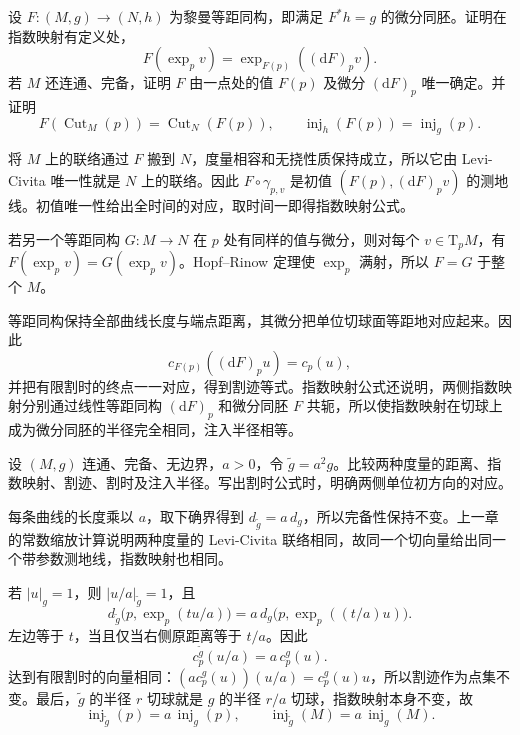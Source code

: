 \begin{exercise}\label{g3:ex:isometry-first-jet}
	设 \(F:(M,g)\to(N,h)\) 为黎曼等距同构，即满足 \(F^*h=g\) 的微分同胚。证明在指数映射有定义处，
	\[
		F(\exp_pv)=\exp_{F(p)}((\mathrm dF)_pv).
	\]
	若 \(M\) 还连通、完备，证明 \(F\) 由一点处的值 \(F(p)\) 及微分 \((\mathrm dF)_p\) 唯一确定。并证明
	\[
		F(\operatorname{Cut}_M(p))=\operatorname{Cut}_N(F(p)),\qquad
		\operatorname{inj}_h(F(p))=\operatorname{inj}_g(p).
	\]
\end{exercise}
\begin{solution}
	将 \(M\) 上的联络通过 \(F\) 搬到 \(N\)，度量相容和无挠性质保持成立，所以它由 Levi-Civita 唯一性就是 \(N\) 上的联络。因此 \(F\circ\gamma_{p,v}\) 是初值 \((F(p),(\mathrm dF)_pv)\) 的测地线。初值唯一性给出全时间的对应，取时间一即得指数映射公式。

	若另一个等距同构 \(G:M\to N\) 在 \(p\) 处有同样的值与微分，则对每个 \(v\in\mathrm T_pM\)，有 \(F(\exp_pv)=G(\exp_pv)\)。Hopf--Rinow 定理使 \(\exp_p\) 满射，所以 \(F=G\) 于整个 \(M\)。

	等距同构保持全部曲线长度与端点距离，其微分把单位切球面等距地对应起来。因此
	\[
		c_{F(p)}((\mathrm dF)_pu)=c_p(u),
	\]
	并把有限割时的终点一一对应，得到割迹等式。指数映射公式还说明，两侧指数映射分别通过线性等距同构 \((\mathrm dF)_p\) 和微分同胚 \(F\) 共轭，所以使指数映射在切球上成为微分同胚的半径完全相同，注入半径相等。
\end{solution}

\begin{exercise}\label{g3:ex:scaling-cut-injectivity}
	设 \((M,g)\) 连通、完备、无边界，\(a>0\)，令 \(\widetilde g=a^2g\)。比较两种度量的距离、指数映射、割迹、割时及注入半径。写出割时公式时，明确两侧单位初方向的对应。
\end{exercise}
\begin{solution}
	每条曲线的长度乘以 \(a\)，取下确界得到 \(d_{\widetilde g}=a\,d_g\)，所以完备性保持不变。上一章的常数缩放计算说明两种度量的 Levi-Civita 联络相同，故同一个切向量给出同一个带参数测地线，指数映射也相同。

	若 \(|u|_g=1\)，则 \(|u/a|_{\widetilde g}=1\)，且
	\[
		d_{\widetilde g}\bigl(p,\exp_p(tu/a)\bigr)
		=a\,d_g\bigl(p,\exp_p((t/a)u)\bigr).
	\]
	左边等于 \(t\)，当且仅当右侧原距离等于 \(t/a\)。因此
	\[
		c_p^{\widetilde g}(u/a)=a\,c_p^g(u).
	\]
	达到有限割时的向量相同：\((a c_p^g(u))(u/a)=c_p^g(u)u\)，所以割迹作为点集不变。最后，\(\widetilde g\) 的半径 \(r\) 切球就是 \(g\) 的半径 \(r/a\) 切球，指数映射本身不变，故
	\[
		\operatorname{inj}_{\widetilde g}(p)=a\,\operatorname{inj}_g(p),\qquad
		\operatorname{inj}_{\widetilde g}(M)=a\,\operatorname{inj}_g(M).
	\]
\end{solution}
